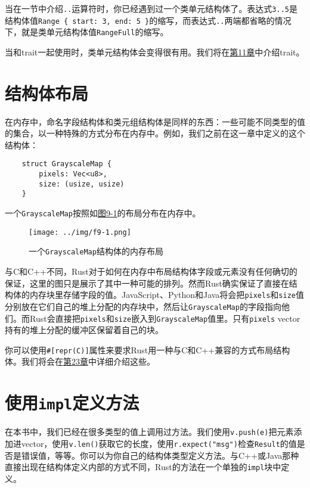 当在一节中介绍\texttt{..}运算符时，你已经遇到过一个类单元结构体了。表达式\texttt{3..5}是结构体值\texttt{Range \{ start: 3, end: 5 \}}的缩写，而表达式\texttt{..}两端都省略的情况下，就是类单元结构体值\texttt{RangeFull}的缩写。

当和trait一起使用时，类单元结构体会变得很有用。我们将在\hyperref[ch11]{第11章}中介绍trait。

\section{结构体布局}

在内存中，命名字段结构体和类元组结构体是同样的东西：一些可能不同类型的值的集合，以一种特殊的方式分布在内存中。例如，我们之前在这一章中定义的这个结构体：
\begin{verbatim}
    struct GrayscaleMap {
        pixels: Vec<u8>,
        size: (usize, usize)
    }
\end{verbatim}

一个\texttt{GrayscaleMap}按照如\hyperref[f9-1]{图9-1}的布局分布在内存中。

\begin{figure}[htbp]
    \centering
    \texttt{[image: ../img/f9-1.png]}
    \caption{一个\texttt{GrayscaleMap}结构体的内存布局}
    \label{f9-1}
\end{figure}

与C和C++不同，Rust对于如何在内存中布局结构体字段或元素没有任何确切的保证，这里的图只是展示了其中一种可能的排列。然而Rust确实保证了直接在结构体的内存块里存储字段的值。JavaScript、Python和Java将会把\texttt{pixels}和\texttt{size}值分别放在它们自己的堆上分配的内存块中，然后让\texttt{GrayscaleMap}的字段指向他们。而Rust会直接把\texttt{pixels}和\texttt{size}嵌入到\texttt{GrayscaleMap}值里。只有\texttt{pixels} vector持有的堆上分配的缓冲区保留着自己的块。

你可以使用\texttt{\#[repr(C)]}属性来要求Rust用一种与C和C++兼容的方式布局结构体。我们将会在\hyperref[ch23]{第23章}中详细介绍这些。

\section{使用\texttt{impl}定义方法}\label{method}

在本书中，我们已经在很多类型的值上调用过方法。我们使用\texttt{v.push(e)}把元素添加进vector，使用\texttt{v.len()}获取它的长度，使用\texttt{r.expect("msg")}检查\texttt{Result}的值是否是错误值，等等。你可以为你自己的结构体类型定义方法。与C++或Java那种直接出现在结构体定义内部的方式不同，Rust的方法在一个单独的\texttt{impl}块中定义。

